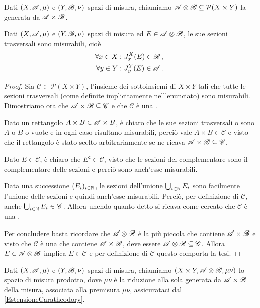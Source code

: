\begin{definition}\label{def:SigAlgProdotto}
	Dati $(X,\mathscr A,\mu)$ e $(Y,\mathscr B,\nu)$ spazi di misura, chiamiamo $\mathscr A\otimes\mathscr B\subseteq \mathcal P(X\times Y)$ la \sigalg{} generata da $\mathscr A\times\mathscr B$. 
\end{definition}

\begin{proposition}\label{prop:SezioniMisurabili}
	Dati $(X,\mathscr A,\mu)$ e $(Y,\mathscr B,\nu)$ spazi di misura ed $E\in\mathscr A\otimes\mathscr B$, le sue sezioni trasversali sono misurabili, cioè
	\begin{align*}
		\forall x\in X:\ &J^X_x(E)\in\mathscr B \, \text{, } \\
		\forall y\in Y:\ &J^Y_y(E)\in\mathscr A \, \text{. }
	\end{align*}
\end{proposition}
\begin{proof}
	\newcommand{\C}{\ensuremath{\mathscr C}}
	Sia $\C\subset\mathcal P(X\times Y)$, l'insieme dei sottoinsiemi di $X\times Y$ tali che tutte le sezioni trasversali (come definite implicitamente nell'enunciato) sono misurabili.
	Dimostriamo ora che $\A\times\B\subseteq \C$ e che $\C$ è una \sigalg{}.
	
	Dato un rettangolo $A\times B\in\mathscr A\times B$, è chiaro che le sue sezioni trasversali o sono $A$ o $B$ o vuote e in ogni caso risultano misurabili, perciò vale $A\times B\in\C$ e visto che il rettangolo è stato scelto arbitrariamente se ne ricava $\A\times\B\subseteq \C$.
	
	Dato $E\in\C$, è chiaro che $E^\mathsf{c}\in\C$, visto che le sezioni del complementare sono il complementare delle sezioni e perciò sono anch'esse misurabili.
	
	Data una successione $(E_i)_{i\in\mathbb N}$, le sezioni dell'unione $\bigcup_{i\in\mathbb N}E_i$ sono facilmente l'unione delle sezioni e quindi anch'esse misurabili. Perciò, per definizione di $\C$, anche $\bigcup_{i\in\N}E_i\in\C$.
	Allora unendo quanto detto si ricava come cercato che $\C$ è una \sigalg{}.
	
	Per concludere basta ricordare che $\mathscr A\otimes\mathscr B$ è la più piccola \sigalg{} che contiene $\mathscr A\times\mathscr B$ e visto che $\C$ è una \sigalg{} che contiene $\mathscr A\times\mathscr B$, deve essere $\A\otimes\B\subseteq\C$. Allora $E\in\mathscr A\otimes\mathscr B$ implica $E\in\C$ e per definizione di $\C$ questo comporta la tesi.
\end{proof}

\begin{definition}\label{def:MisuraProdotto}
	Dati $(X,\mathscr A,\mu)$ e $(Y,\mathscr B,\nu)$ spazi di misura, chiamiamo $(X\times Y,\mathscr A\otimes\mathscr B,\mu\nu)$ lo spazio di misura prodotto, dove $\mu\nu$ è la riduzione alla sola \sigalg{} generata da $\mathscr A\times\mathscr B$ della misura, associata alla premisura $\overline{\mu\nu}$, assicurataci dal \cref{EstensioneCaratheodory}.
\end{definition}

